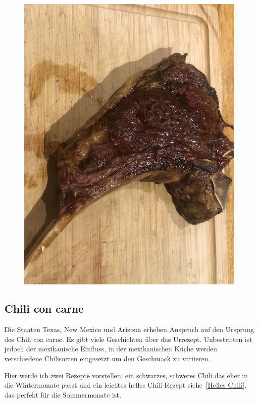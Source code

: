 \begin{figure}[htbp]
	\centering
	\begin{minipage}{1\textwidth}
	\centering
	\includegraphics[width=.9\linewidth]{pics/Tomahawk_gegrillt}
	\label{fig:Toma2}
	\end{minipage}
\end{figure}
\newpage

\subsection{Chili con carne}
Die Staaten Texas, New Mexico und Arizona erheben Anspruch auf den Ursprung des Chili con carne. Es gibt viele Geschichten über das 
Urrezept. Unbestritten ist jedoch 
der mexikanische Einfluss, in der mexikanischen Küche werden verschiedene 
Chilisorten eingesetzt um den Geschmack zu variieren.

Hier werde ich zwei Rezepte vorstellen, ein schwarzes, schweres Chili das 
eher in die Wintermonate passt und ein leichtes helles Chili Rezept 
siehe~\vref{Helles Chili}, das perfekt für die Sommermonate ist.

